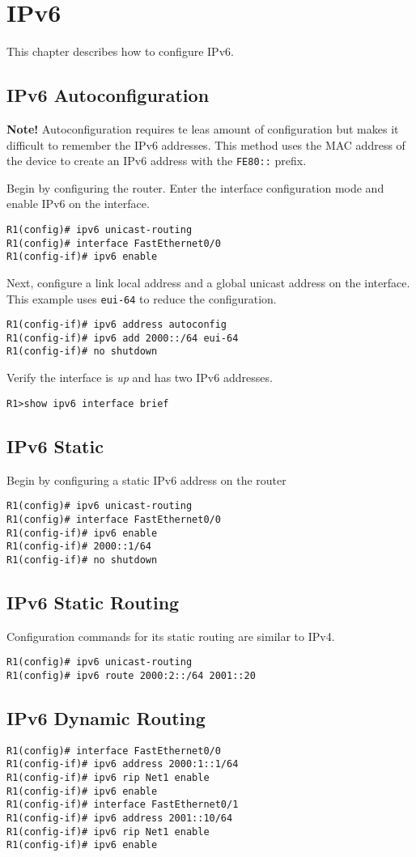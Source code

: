 \section{IPv6}
This chapter describes how to configure IPv6.

\subsection{IPv6 Autoconfiguration}
\begin{tcolorbox}
\textbf{Note!} Autoconfiguration requires te leas amount of configuration but makes it difficult to remember the IPv6 addresses.
This method uses the MAC address of the device to create an IPv6 address with the \verb!FE80::! prefix.
\end{tcolorbox}
Begin by configuring the router. Enter the interface configuration mode and enable IPv6 on the interface.
\begin{verbatim}
R1(config)# ipv6 unicast-routing
R1(config)# interface FastEthernet0/0
R1(config-if)# ipv6 enable
\end{verbatim}
Next, configure a link local address and a global unicast address on the interface. This example uses \verb!eui-64! to reduce the configuration.
\begin{verbatim}
R1(config-if)# ipv6 address autoconfig
R1(config-if)# ipv6 add 2000::/64 eui-64
R1(config-if)# no shutdown
\end{verbatim}
Verify the interface is \textit{up} and has two IPv6 addresses.
\begin{verbatim}
R1>show ipv6 interface brief
\end{verbatim}

\subsection{IPv6 Static}
Begin by configuring a static IPv6 address on the router
\begin{verbatim}
R1(config)# ipv6 unicast-routing
R1(config)# interface FastEthernet0/0
R1(config-if)# ipv6 enable
R1(config-if)# 2000::1/64
R1(config-if)# no shutdown
\end{verbatim}

\subsection{IPv6 Static Routing}
Configuration commands for its static routing are similar to IPv4.
\begin{verbatim}
R1(config)# ipv6 unicast-routing
R1(config)# ipv6 route 2000:2::/64 2001::20
\end{verbatim}

\subsection{IPv6 Dynamic Routing}
\begin{verbatim}
R1(config)# interface FastEthernet0/0
R1(config-if)# ipv6 address 2000:1::1/64
R1(config-if)# ipv6 rip Net1 enable
R1(config-if)# ipv6 enable
R1(config-if)# interface FastEthernet0/1
R1(config-if)# ipv6 address 2001::10/64
R1(config-if)# ipv6 rip Net1 enable
R1(config-if)# ipv6 enable
\end{verbatim}
